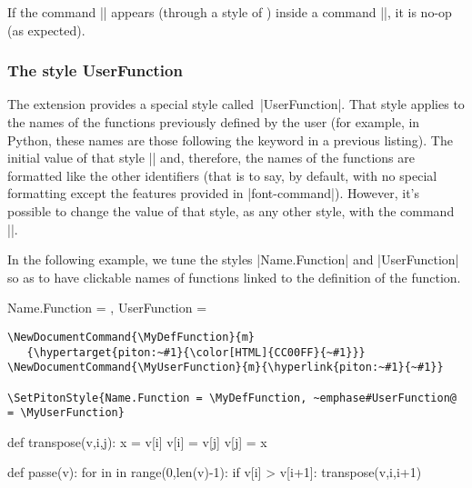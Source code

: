 \documentclass{article}
\begin{document}
\bigskip
If the command |\rowcolor| appears (through a style of ) inside a
command |\piton|, it is no-op (as expected).


\subsubsection{The style UserFunction}


The extension  provides a special style called~|UserFunction|.
That style applies to the names of the functions previously defined by the user
(for example, in Python, these names are those following the keyword 
in a previous listing). The initial value of that style ||
and, therefore, the names of the functions are formatted like the other identifiers
(that is to say, by default, with no special formatting except the features provided
in |font-command|). However, it's possible to change the value of that style, as any
other style, with the command |\SetPitonStyle|.

\medskip
In the following example, we tune the styles |Name.Function| and |UserFunction|
so as to have clickable names of functions linked to the definition of the function.

\begingroup


\SetPitonStyle
  {
    Name.Function = \MyDefFunction ,
    UserFunction = \MyUserFunction
  }

\medskip
\begin{Verbatim}
\NewDocumentCommand{\MyDefFunction}{m}
   {\hypertarget{piton:~#1}{\color[HTML]{CC00FF}{~#1}}}
\NewDocumentCommand{\MyUserFunction}{m}{\hyperlink{piton:~#1}{~#1}}

\SetPitonStyle{Name.Function = \MyDefFunction, ~emphase#UserFunction@ = \MyUserFunction}
\end{Verbatim}

\smallskip

\begin{Piton}
def transpose(v,i,j):
    x = v[i]
    v[i] = v[j]
    v[j] = x 

def passe(v):
    for in in range(0,len(v)-1):
        if v[i] > v[i+1]:
            transpose(v,i,i+1)
\end{Piton}
\end{document}
